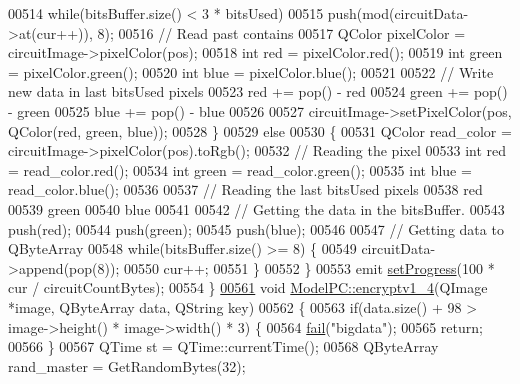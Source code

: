 \begin{DoxyCode}
00514         \textcolor{keywordflow}{while}(bitsBuffer.size() < 3 * bitsUsed)
00515             push(mod(circuitData->at(cur++)), 8);
00516         \textcolor{comment}{// Read past contains}
00517         QColor pixelColor = circuitImage->pixelColor(pos);
00518         \textcolor{keywordtype}{int} red = pixelColor.red();
00519         \textcolor{keywordtype}{int} green = pixelColor.green();
00520         \textcolor{keywordtype}{int} blue = pixelColor.blue();
00521 
00522         \textcolor{comment}{// Write new data in last bitsUsed pixels}
00523         red += pop() - red %
00524         green += pop() - green %
00525         blue += pop() - blue %
00526 
00527         circuitImage->setPixelColor(pos, QColor(red, green, blue));
00528     \}
00529     \textcolor{keywordflow}{else}
00530     \{
00531         QColor read\_color = circuitImage->pixelColor(pos).toRgb();
00532         \textcolor{comment}{// Reading the pixel}
00533         \textcolor{keywordtype}{int} red = read\_color.red();
00534         \textcolor{keywordtype}{int} green = read\_color.green();
00535         \textcolor{keywordtype}{int} blue = read\_color.blue();
00536 
00537         \textcolor{comment}{// Reading the last bitsUsed pixels}
00538         red %
00539         green %
00540         blue %
00541 
00542         \textcolor{comment}{// Getting the data in the bitsBuffer.}
00543         push(red);
00544         push(green);
00545         push(blue);
00546 
00547         \textcolor{comment}{// Getting data to QByteArray}
00548         \textcolor{keywordflow}{while}(bitsBuffer.size() >= 8) \{
00549             circuitData->append(pop(8));
00550             cur++;
00551         \}
00552     \}
00553     emit \hyperlink{class_model_p_c_afdcd80f0ed5062e145a71f09b0897547}{setProgress}(100 * cur / circuitCountBytes);
00554 \}
\hypertarget{modelpc_8cpp_source.tex_l00561}{}\hyperlink{class_model_p_c_a4daefc3fb87a1f19172b9b20c987eb12}{00561} \textcolor{keywordtype}{void} \hyperlink{class_model_p_c_a4daefc3fb87a1f19172b9b20c987eb12}{ModelPC::encryptv1\_4}(QImage *image, QByteArray data, QString key)
00562 \{
00563     \textcolor{keywordflow}{if}(data.size() + 98 > image->height() * image->width() * 3) \{
00564         \hyperlink{class_model_p_c_a47464b59b7e37fcee25e55475708aabd}{fail}(\textcolor{stringliteral}{"bigdata"});
00565         \textcolor{keywordflow}{return};
00566     \}
00567     QTime st = QTime::currentTime();
00568     QByteArray rand\_master = GetRandomBytes(32);

\end{DoxyCode}
